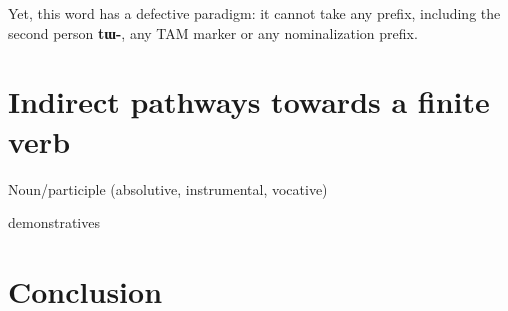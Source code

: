 \documentclass[11pt]{article}
\newcommand{\ipa}[1]{{\phon\textbf{#1}}}
\begin{document}
Yet, this word has a defective paradigm: it cannot take any prefix, including the second person \ipa{tɯ-}, any TAM marker or any nominalization prefix.

\section{Indirect pathways towards a finite verb}

Noun/participle (absolutive, instrumental, vocative)

demonstratives

\section*{Conclusion}




 
\end{document}
